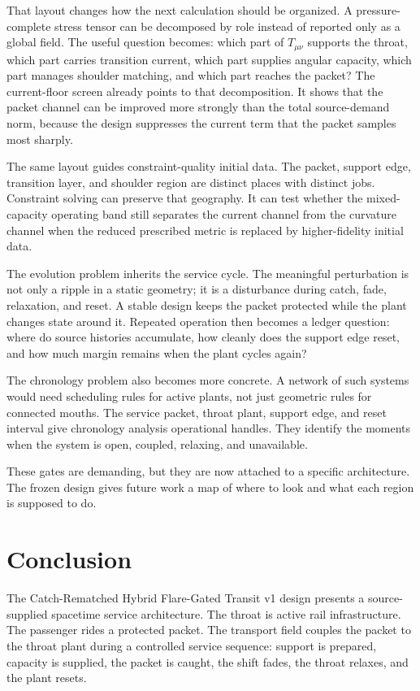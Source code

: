 \documentclass[11pt]{article}
\begin{document}
That layout changes how the next calculation should be organized. A pressure-complete stress tensor can be decomposed by role instead of reported only as a global field. The useful question becomes: which part of $T_{\mu\nu}$ supports the throat, which part carries transition current, which part supplies angular capacity, which part manages shoulder matching, and which part reaches the packet? The current-floor screen already points to that decomposition. It shows that the packet channel can be improved more strongly than the total source-demand norm, because the design suppresses the current term that the packet samples most sharply.

The same layout guides constraint-quality initial data. The packet, support edge, transition layer, and shoulder region are distinct places with distinct jobs. Constraint solving can preserve that geography. It can test whether the mixed-capacity operating band still separates the current channel from the curvature channel when the reduced prescribed metric is replaced by higher-fidelity initial data.

The evolution problem inherits the service cycle. The meaningful perturbation is not only a ripple in a static geometry; it is a disturbance during catch, fade, relaxation, and reset. A stable design keeps the packet protected while the plant changes state around it. Repeated operation then becomes a ledger question: where do source histories accumulate, how cleanly does the support edge reset, and how much margin remains when the plant cycles again?

The chronology problem also becomes more concrete. A network of such systems would need scheduling rules for active plants, not just geometric rules for connected mouths. The service packet, throat plant, support edge, and reset interval give chronology analysis operational handles. They identify the moments when the system is open, coupled, relaxing, and unavailable.

These gates are demanding, but they are now attached to a specific architecture. The frozen design gives future work a map of where to look and what each region is supposed to do.

\section{Conclusion}

The Catch-Rematched Hybrid Flare-Gated Transit v1 design presents a source-supplied spacetime service architecture. The throat is active rail infrastructure. The passenger rides a protected packet. The transport field couples the packet to the throat plant during a controlled service sequence: support is prepared, capacity is supplied, the packet is caught, the shift fades, the throat relaxes, and the plant resets.
\end{document}
